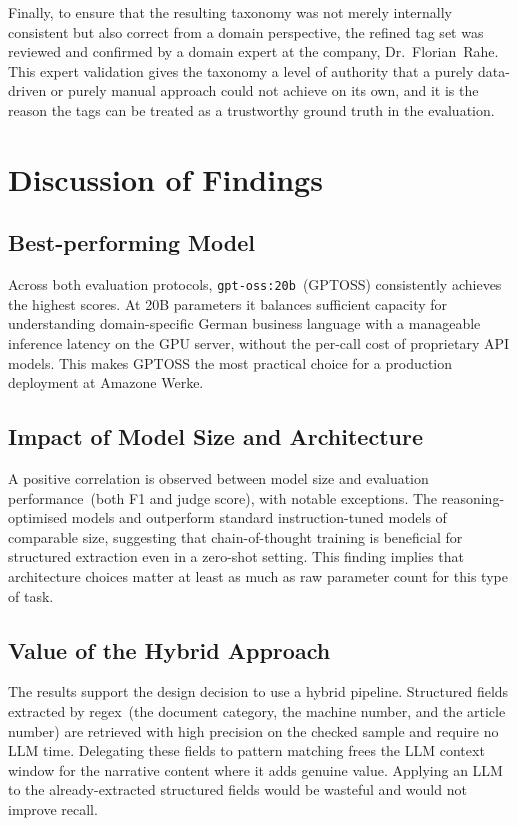 Finally, to ensure that the resulting taxonomy was not merely internally
consistent but also correct from a domain perspective, the refined tag set was
reviewed and confirmed by a domain expert at the company, Dr.~Florian~Rahe.
This expert validation gives the taxonomy a level of authority that a purely
data-driven or purely manual approach could not achieve on its own, and it is
the reason the tags can be treated as a trustworthy ground truth in the
evaluation.

\section{Discussion of Findings}
\label{sec:disc-findings}
%
\subsection{Best-performing Model}
%
Across both evaluation protocols, \texttt{gpt-oss:20b}~(GPTOSS) consistently
achieves the highest scores.  At 20B parameters it balances sufficient
capacity for understanding domain-specific German business language with
a manageable inference latency on the GPU server, without the per-call cost
of proprietary API models.  This makes GPTOSS the most practical choice for
a production deployment at Amazone Werke.

\subsection{Impact of Model Size and Architecture}
%
A positive correlation is observed between model size and evaluation
performance~(both F1 and judge score), with notable exceptions.  The
reasoning-optimised models \texttt{} and
\texttt{}
outperform standard instruction-tuned models of comparable size, suggesting
that chain-of-thought training is beneficial for structured extraction even
in a zero-shot setting.  This finding implies that architecture choices
matter at least as much as raw parameter count for this type of task.

\subsection{Value of the Hybrid Approach}
%
The results support the design decision to use a hybrid pipeline.  Structured
fields extracted by regex~(the document category, the machine number, and the
article number) are retrieved with high precision on the checked sample and
require no LLM time.  Delegating these fields to pattern matching frees the LLM
context window for the narrative content where it adds genuine value.  Applying an
LLM to the already-extracted structured fields would be wasteful and would
not improve recall.

